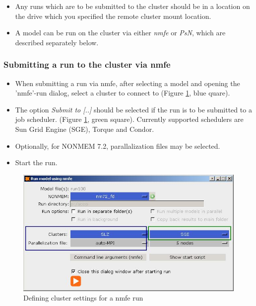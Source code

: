   \begin{itemize}
  \item Any runs which are to be submitted to the cluster should be in
    a location on the drive which you specified the remote cluster
    mount location.
  \item A model can be run on the cluster via either \emph{nmfe} or
    \emph{PsN}, which are described separately below.
\end{itemize}

\subsubsection*{Submitting a run to the cluster via nmfe}
  \begin{itemize}
  \item When submitting a run via nmfe, after selecting a model and
    opening the 'nmfe'-run dialog, select a cluster to connect to
    (Figure  \ref{fig:Fig4}, blue quare).
  \item The option \emph{Submit to [..]} should be selected if the run is to be
    submitted to a job scheduler. (Figure  \ref{fig:Fig4}, green square). 
    Currently supported schedulers are Sun Grid Engine (SGE), Torque and Condor.
  \item Optionally, for NONMEM 7.2, parallalization files may be
    selected.
  \item Start the run.
\end{itemize}

\begin{figure}[h] \centering
    \includegraphics[scale=.4]{images/cluster_4.JPG}
    \caption{Defining cluster settings for a nmfe run\label{fig:Fig4}
}
\end{figure}

\pagebreak

